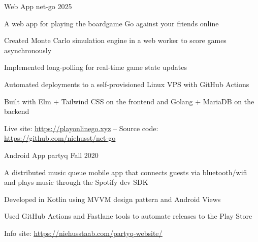 \documentclass[11pt, a4paper]{awesome-cv}
\begin{document}
\begin{cventries}

  \cventry
    {Web App}
    {net-go}
    {2025}
    {}
    {
      \begin{cvitems}
        \item{A web app for playing the boardgame Go against your friends online}
        \item{Created Monte Carlo simulation engine in a web worker to score games asynchronously}
        \item{Implemented long-polling for real-time game state updates}
        \item{Automated deployments to a self-provisioned Linux VPS with GitHub Actions}
        \item{Built with Elm + Tailwind CSS on the frontend and Golang + MariaDB on the backend}
        \item{Live site: \underline{\href{https://playonlinego.xyz}{https://playonlinego.xyz}} -- Source code: \underline{\href{https://github.com/niehusst/net-go}{https://github.com/niehusst/net-go}}}
      \end{cvitems}
    }

  \cventry
    {Android App}
    {partyq}
    {Fall 2020}
    {}
    {
      \begin{cvitems}
        \item{A distributed music queue mobile app that connects guests via bluetooth/wifi and plays music through the Spotify dev SDK}
        \item{Developed in Kotlin using MVVM design pattern and Android Views}
        \item{Used GitHub Actions and Fastlane tools to automate releases to the Play Store}
        \item{Info site: \underline{\href{https://niehusstaab.com/partyq-website/}{https://niehusstaab.com/partyq-website/}}}
      \end{cvitems}
    }



\end{cventries}
\end{document}
